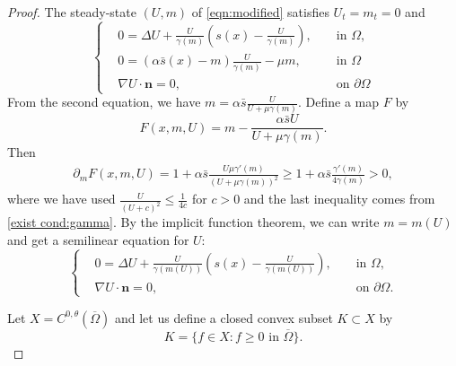 \documentclass{article}
\begin{document}
\begin{proof}
    The steady-state $(U,m)$ of \eqref{eqn:modified} satisfies $U_t=m_t=0$ and 
    \begin{equation}\label{eqn:SS logistic}
        \left\{\begin{aligned}
            & 0 = \Delta U +\frac{U}{\gamma(m)}\left(s(x)-\frac{U}{\gamma(m)}\right), && \text{ in }\Omega,\\
            & 0 = (\alpha \bar s(x) -m)\frac{U}{\gamma(m)} -\mu m, && \text{ in }\Omega\\
            &\nabla U\cdot \textbf{n}=0, && \text{ on }\partial\Omega
        \end{aligned}\right.
    \end{equation} From the second equation, we have $m=\alpha\bar s\frac{U}{U+\mu\gamma(m)}$. Define a map $F$ by $$F(x,m,U)=m-\frac{\alpha\bar s U}{U+\mu\gamma(m)}.$$ Then
    \begin{align*}
        \partial_m F(x,m,U) = 1 +\alpha\bar s \frac{U\mu\gamma'(m)}{(U+\mu\gamma(m))^2}\ge 1+\alpha\bar s \frac{\gamma'(m)}{4\gamma(m)}>0,
    \end{align*} where we have used $\frac{U}{(U+c)^2}\le \frac{1}{4c}$ for $c>0$ and the last inequality comes from \eqref{exist cond:gamma}. By the implicit function theorem, we can write $m=m(U)$ and get a semilinear equation for $U$: 
    \begin{equation*}
    \left\{\begin{aligned}
         & 0 = \Delta U +\frac{U}{\gamma(m(U))}\left(s(x)-\frac{U}{\gamma(m(U))}\right), && \text{ in }\Omega,\\
            &\nabla U\cdot \textbf{n}=0, && \text{ on }\partial\Omega.
    \end{aligned}\right.
    \end{equation*} 

    Let $X=C^{0,\theta}(\overline{\Omega})$ and let us define a closed convex subset $K\subset X$ by
    $$K=\{f\in X : f\ge 0 \text{ in } \overline{\Omega}\}.$$
    

\end{proof}
\end{document}

